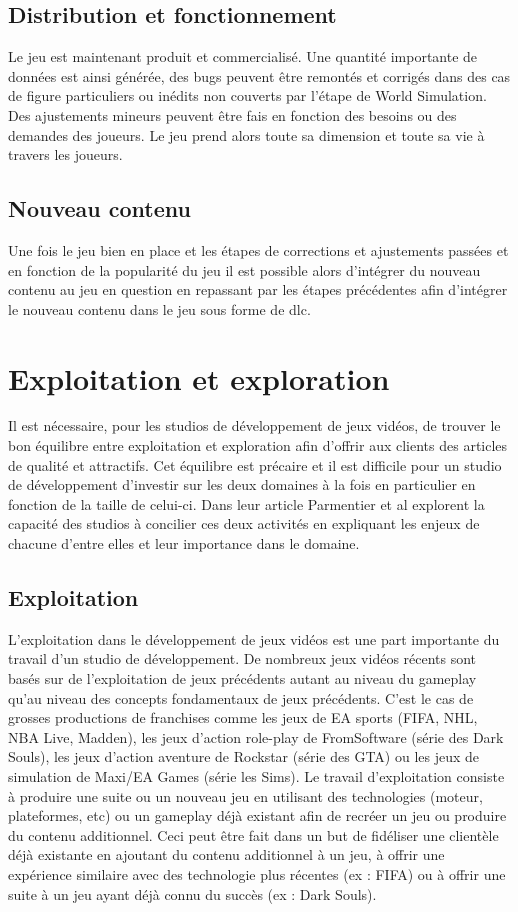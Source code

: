 \subsection{Distribution et fonctionnement}
Le jeu est maintenant produit et commercialisé. Une quantité importante de données est ainsi générée, des bugs peuvent être remontés et corrigés dans des cas de figure particuliers ou inédits non couverts par l'étape de World Simulation. Des ajustements mineurs peuvent être fais en fonction des besoins ou des demandes des joueurs. Le jeu prend alors toute sa dimension et toute sa vie à travers les joueurs.

\subsection{Nouveau contenu}
Une fois le jeu bien en place et les étapes de corrections et ajustements passées et en fonction de la popularité du jeu il est possible alors d'intégrer du nouveau contenu au jeu en question en repassant par les étapes précédentes afin d'intégrer le nouveau contenu dans le jeu sous forme de \gls{dlc}.



\section{Exploitation et exploration}
Il est nécessaire, pour les studios de développement de jeux vidéos, de trouver le bon équilibre entre exploitation et exploration afin d'offrir aux clients des articles de qualité et attractifs. Cet équilibre est précaire et il est difficile pour un studio de développement d'investir sur les deux domaines à la fois en particulier en fonction de la taille de celui-ci. Dans leur article Parmentier et al \cite{ParmentierGuy2009Iecd} explorent la capacité des studios à concilier ces deux activités en expliquant les enjeux de chacune d'entre elles et leur importance dans le domaine.
\subsection{Exploitation}
L'exploitation dans le développement de jeux vidéos est une part importante du travail d'un studio de développement. De nombreux jeux vidéos récents sont basés sur de l'exploitation de jeux précédents autant au niveau du gameplay qu'au niveau des concepts fondamentaux de jeux précédents. C'est le cas de grosses productions de franchises comme les jeux de EA sports (FIFA, NHL, NBA Live, Madden), les jeux d'action role-play de FromSoftware (série des Dark Souls), les jeux d'action aventure de Rockstar (série des GTA) ou les jeux de simulation de Maxi/EA Games (série les Sims). Le travail d'exploitation consiste à produire une suite ou un nouveau jeu en utilisant des technologies (moteur, plateformes, etc) ou un gameplay déjà existant afin de recréer un jeu ou produire du contenu additionnel. Ceci peut être fait dans un but de fidéliser une clientèle déjà existante en ajoutant du contenu additionnel à un jeu, à offrir une expérience similaire avec des technologie plus récentes (ex : FIFA) ou à offrir une suite à un jeu ayant déjà connu du succès (ex : Dark Souls).

